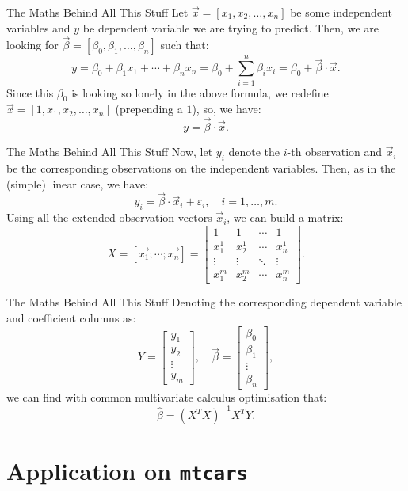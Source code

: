 \documentclass[aspectratio=169, 12pt, xcolor=table]{beamer}
\begin{document}
	\begin{frame}{The Maths Behind All This Stuff}
		Let $\vec{x}=[x_1,x_2,\ldots,x_n]$ be some independent variables and $y$ be dependent variable we are trying to predict. Then, we are looking for $\vec{\beta}=[\beta_0,\beta_1,\ldots,\beta_n]$ such that:
		\[y=\beta_0+\beta_1x_1+\cdots+\beta_nx_n=\beta_0+\sum_{i=1}^n\beta_ix_i=\beta_0+\vec{\beta}\cdot\vec{x}.\]
		Since this $\beta_0$ is looking so lonely in the above formula, we redefine $\vec{x}=[1,x_1,x_2,\ldots,x_n]$ (prepending a $1$), so, we have:
		\[y=\vec{\beta}\cdot\vec{x}.\]
	\end{frame}

	\begin{frame}{The Maths Behind All This Stuff}
		Now, let $y_i$ denote the $i$-th observation and $\vec{x}_i$ be the corresponding observations on the independent variables. Then, as in the (simple) linear case, we have:
		\[y_i=\vec{\beta}\cdot\vec{x}_i+\varepsilon_i,\quad i=1,\ldots,m.\]
		Using all the extended observation vectors $\vec{x}_i$, we can build a matrix:
		\[X=[\vec{x_1};\cdots;\vec{x_n}]=\left[\begin{array}{cccc}
			1 & 1 & \cdots & 1 \\
			x_1^1 & x_2^1 & \cdots & x_n^1\\
			\vdots & \vdots & \ddots & \vdots \\
			x_1^m & x_2^m & \cdots & x_n^m
		\end{array}\right].\]
	\end{frame}

	\begin{frame}{The Maths Behind All This Stuff}
		Denoting the corresponding dependent variable and coefficient columns as:
		\[Y=\left[\begin{array}{c}
			y_1 \\ y_2 \\ \vdots \\ y_m
		\end{array}\right],\quad \vec{\beta}=\left[\begin{array}{c}
			\beta_0 \\ \beta_1 \\ \vdots \\ \beta_n
		\end{array}\right],\]
		we can find with common multivariate calculus optimisation that:
		\[\hat{\beta}=(X^TX)^{-1}X^TY.\]
	\end{frame}

	\section{Application on \texttt{mtcars}}
	
\end{document}

